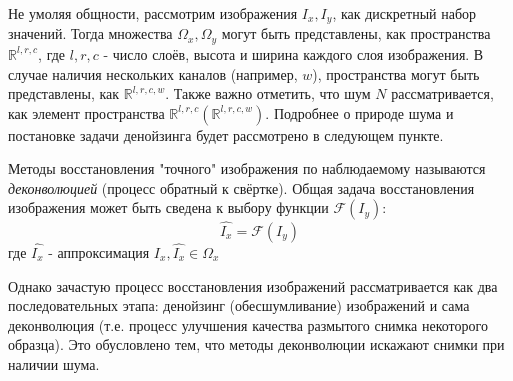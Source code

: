 \par Не умоляя общности, рассмотрим изображения $I_x, I_y$, как дискретный набор значений. Тогда множества $\Omega_x, \Omega_y$ могут быть представлены, как пространства $\mathbb{R}^{l,r,c}$, где $l, r, c$ - число слоёв, высота и ширина каждого слоя изображения. В случае наличия нескольких каналов (например, $w$), пространства могут быть представлены, как $\mathbb{R}^{l,r,c,w}$. Также важно отметить, что шум $N$ рассматривается, как элемент пространства $\mathbb{R}^{l,r,c} (\mathbb{R}^{l,r,c,w})$. Подробнее о природе шума и постановке задачи денойзинга будет рассмотрено в следующем пункте.
\par Методы восстановления "точного" изображения по наблюдаемому называются \textit{деконволюцией} (процесс обратный к свёртке). Общая задача восстановления изображения может быть сведена к выбору функции $\mathscr{F}(I_y)$:
\begin{equation}
	\hat{I_x} = \mathscr{F}(I_y)
\end{equation}
где $\hat{I_x}$ - аппроксимация $I_x, \hat{I_x} \in \Omega_x$
\par Однако зачастую процесс восстановления изображений рассматривается как два последовательных этапа: денойзинг (обесшумливание) изображений и сама деконволюция (т.е. процесс улучшения качества размытого снимка некоторого образца). Это обусловлено тем, что методы деконволюции искажают снимки при наличии шума.

